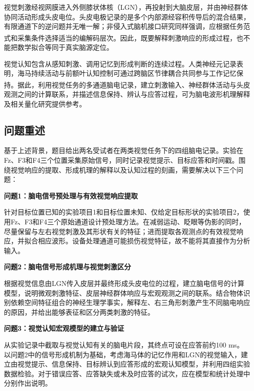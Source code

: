 \documentclass[a4paper,zihao=-4,linespread=1]{ctexart}
\numberwithin{figure}{section}       %
\newcommand{\upcite}[1]{\textsuperscript{\cite{#1}}} %
\begin{document}
视觉刺激经视网膜进入外侧膝状体核（LGN），再投射到大脑皮层，并由神经群体协同活动形成头皮电位。头皮电极记录的是多个内部源经容积传导后的混合结果，有限通道下的逆问题并无唯一解；非侵入式脑机接口研究同样强调，应根据任务范式和采集条件选择适当的编解码层次\upcite{qiu2023bci,ding2024bci}。因此，既要解释刺激响应的形成过程，也不能把数学拟合等同于真实脑源定位。

视觉认知包含从感知刺激、调用记忆到形成判断的连续过程。人类神经元记录表明，海马持续活动与前额叶认知控制可通过跨脑区节律耦合共同参与工作记忆保持\upcite{daume2024control}。据此，利用视觉任务的多通道脑电记录，建立刺激输入、神经群体活动与头皮观测之间的计算联系，并描述信息保持、辨认与应答过程，可为脑电波形机理解释及相关量化研究提供参考。


\subsection{问题重述}
基于上述背景，题目给出两名受试者在两类视觉任务下的四组脑电记录。实验在Fz、F3和F4三个位置采集原始信号，同时记录视觉提示、目标应答和时间戳。围绕视觉响应的提取、形成机理的解释以及认知过程的刻画，需要解决以下三个问题：

\noindent\textbf{问题1：脑电信号预处理与有效视觉响应提取}

针对目标位置已知的实验项目1和目标位置未知、仅给定目标形状的实验项目2，使用Fz、F3和F4三个原始通道设计预处理方法。在减弱运动、眨眼等伪影的同时，尽量保留与左右视觉刺激及其形状有关的特征；进而提取各观测点的有效视觉响应，并拟合相应波形。设备处理通道可能损伤视觉特征，故不能将其直接作为分析输入。

\noindent\textbf{问题2：脑电信号形成机理与视觉刺激区分}

根据视觉信息由LGN传入皮层并最终形成头皮电位的过程，建立脑电信号的计算模型，说明微观刺激特征、皮层神经群体响应与宏观观测之间的联系。结合物体识别依赖空间特征组合的神经生理学事实，解释左、右三角形刺激产生不同脑电响应的原因，并给出能够表征和区分两类刺激的特征。

\noindent\textbf{问题3：视觉认知宏观模型的建立与验证}

从实验记录中截取与视觉认知有关的脑电片段，其终点可设在应答前约100 ms。以问题2中的信号形成机制为基础，考虑海马体的记忆作用和LGN的视觉输入，建立由视觉提示、信息保持、目标辨认到应答形成的宏观认知模型，并利用四组实验数据检验。对于错误应答、应答缺失或未及时应答的试次，应在模型和统计处理中分别作出说明。
\newpage


\end{document}
